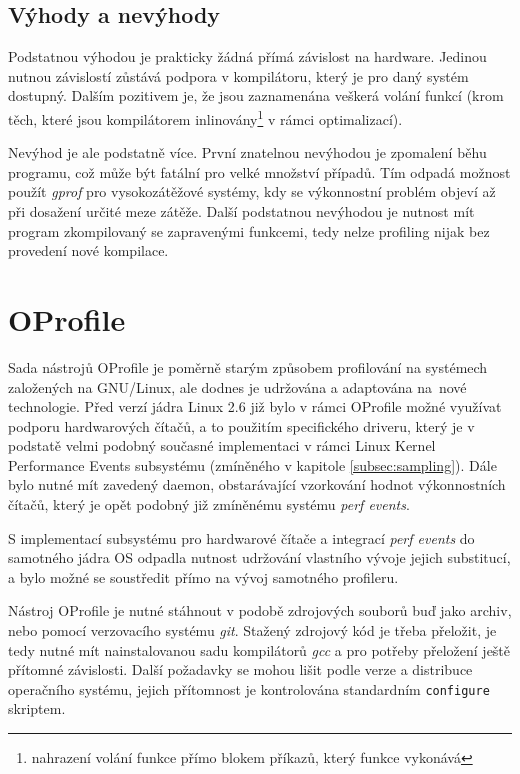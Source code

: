 \documentclass[czech,BP]{thesiskiv}
\begin{document}
\subsection*{Výhody a nevýhody}

Podstatnou výhodou je prakticky žádná přímá závislost na hardware. Jedinou nutnou závislostí zůstává podpora v kompilátoru, který je pro daný systém dostupný. Dalším pozitivem je, že jsou zaznamenána veškerá volání funkcí (krom těch, které jsou kompilátorem inlinovány\footnote{nahrazení volání funkce přímo blokem příkazů, který funkce vykonává} v rámci optimalizací).

Nevýhod je ale podstatně více. První znatelnou nevýhodou je zpomalení běhu programu, což může být fatální pro velké množství případů. Tím odpadá možnost použít \emph{gprof} pro vysokozátěžové systémy, kdy se výkonnostní problém objeví až při dosažení určité meze zátěže. Další podstatnou nevýhodou je nutnost mít program zkompilovaný se zapravenými funkcemi, tedy nelze profiling nijak  bez provedení nové kompilace.




\section{OProfile}

Sada nástrojů OProfile je poměrně starým způsobem profilování na systémech založených na GNU/Linux, ale dodnes je udržována a adaptována na~nové technologie. Před verzí jádra Linux 2.6 již bylo v rámci OProfile možné využívat podporu hardwarových čítačů, a to použitím specifického driveru, který je v podstatě velmi podobný současné implementaci v rámci Linux Kernel Performance Events subsystému (zmíněného v kapitole \ref{subsec:sampling}). Dále bylo nutné mít zavedený daemon, obstarávající vzorkování hodnot výkonnostních čítačů, který je opět podobný již zmíněnému systému \emph{perf events}.

S implementací subsystému pro hardwarové čítače a integrací \emph{perf events} do samotného jádra OS odpadla nutnost udržování vlastního vývoje jejich substitucí, a bylo možné se soustředit přímo na vývoj samotného profileru.

Nástroj OProfile je nutné stáhnout v podobě zdrojových souborů buď jako archiv, nebo pomocí verzovacího systému \emph{git}. Stažený zdrojový kód je třeba přeložit, je tedy nutné mít nainstalovanou sadu kompilátorů \emph{gcc} a pro potřeby přeložení ještě přítomné závislosti. Další požadavky se mohou lišit podle verze a distribuce operačního systému, jejich přítomnost je kontrolována standardním \texttt{configure} skriptem.
\end{document}
